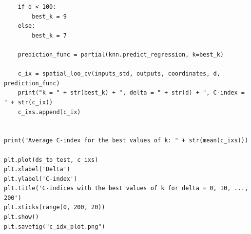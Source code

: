 \documentclass[a4paper]{article}
\begin{document}
\begin{lstlisting}
    if d < 100:
        best_k = 9
    else: 
        best_k = 7
    
    prediction_func = partial(knn.predict_regression, k=best_k)

    c_ix = spatial_loo_cv(inputs_std, outputs, coordinates, d, prediction_func)
    print("k = " + str(best_k) + ", delta = " + str(d) + ", C-index = " + str(c_ix))
    c_ixs.append(c_ix)


print("Average C-index for the best values of k: " + str(mean(c_ixs)))

plt.plot(ds_to_test, c_ixs)
plt.xlabel('Delta')
plt.ylabel('C-index')
plt.title('C-indices with the best values of k for delta = 0, 10, ..., 200')
plt.xticks(range(0, 200, 20))
plt.show()
plt.savefig("c_idx_plot.png")
\end{lstlisting}
\end{document}
